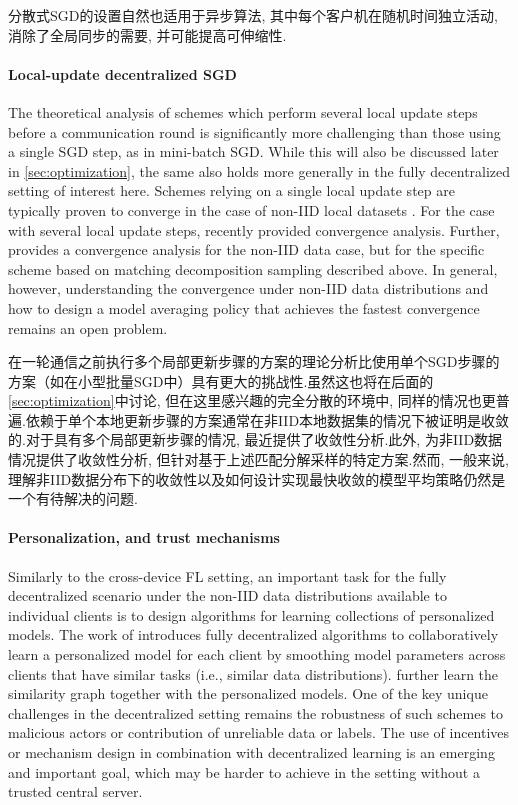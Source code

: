 分散式SGD的设置自然也适用于异步算法, 其中每个客户机在随机时间独立活动, 消除了全局同步的需要, 并可能提高可伸缩性\citep{Colin2016,Vanhaesebrouck2017,Bellet2018a,assran2019stochastic,Lian2018}.

\paragraph{Local-update decentralized SGD}
The theoretical analysis of schemes which perform several local update steps before a communication round is significantly more challenging than those using a single SGD step, as in mini-batch SGD. While this will also be discussed later in \cref{sec:optimization}, the same also holds more generally in the fully decentralized setting of interest here. Schemes relying on a single local update step are typically proven to converge in the case of non-IID local datasets \citep{Koloskova2019, koloskova2019deep}. For the case with several local update steps, \citep{wang2018cooperative,decentralized_sgd2} recently provided convergence analysis. Further, \citep{wang2019matcha} provides a convergence analysis for the non-IID data case, but for the specific scheme based on matching decomposition sampling described above. In general, however, understanding the convergence under non-IID data distributions and how to design a model averaging policy that achieves the fastest convergence remains an open problem.

在一轮通信之前执行多个局部更新步骤的方案的理论分析比使用单个SGD步骤的方案（如在小型批量SGD中）具有更大的挑战性.虽然这也将在后面的\cref{sec:optimization}中讨论, 但在这里感兴趣的完全分散的环境中, 同样的情况也更普遍.依赖于单个本地更新步骤的方案通常在非IID本地数据集\citep{Koloskova2019, koloskova2019deep}的情况下被证明是收敛的.对于具有多个局部更新步骤的情况, \citep{wang2018cooperative,decentralized_sgd2}最近提供了收敛性分析.此外, \citep{wang2019matcha}为非IID数据情况提供了收敛性分析, 但针对基于上述匹配分解采样的特定方案.然而, 一般来说, 理解非IID数据分布下的收敛性以及如何设计实现最快收敛的模型平均策略仍然是一个有待解决的问题.


\paragraph{Personalization, and trust mechanisms}
Similarly to the cross-device FL setting, an important task for the fully decentralized scenario under the non-IID data distributions available to individual clients is to design algorithms for learning collections of personalized models. The work of \citep{Vanhaesebrouck2017,Bellet2018a} introduces fully decentralized algorithms to collaboratively learn a personalized model for each client by smoothing model parameters across clients that have similar tasks (i.e., similar data distributions). \citet{Zantedeschi2019} further learn the similarity graph together with the personalized models. One of the key unique challenges in the decentralized setting remains the robustness of such schemes to malicious actors or contribution of unreliable data or labels. The use of incentives or mechanism design in combination with decentralized learning is an emerging and important goal, which may be harder to achieve in the setting without a trusted central server.

